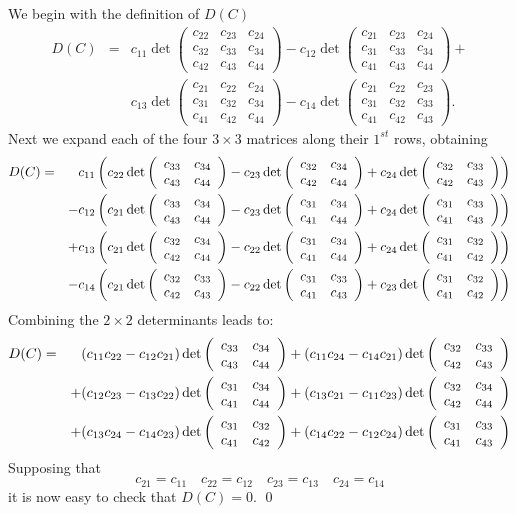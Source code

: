 We begin with the definition of $D(C)$
\begin{eqnarray*}
D(C) & = & c_{11}\det\left(\begin{array}{ccc} c_{22} & c_{23} & c_{24}
\\ c_{32} & c_{33} & c_{34} \\ c_{42} & c_{43} & c_{44}
\end{array}\right) 
-c_{12}\det\left(\begin{array}{ccc} c_{21} & c_{23} & c_{24}
\\ c_{31} & c_{33} & c_{34} \\ c_{41} & c_{43} & c_{44}
\end{array}\right) + \\ & &  
c_{13}\det\left(\begin{array}{ccc} c_{21} & c_{22} & c_{24}
\\ c_{31} & c_{32} & c_{34} \\ c_{41} & c_{42} & c_{44}
\end{array}\right) 
-c_{14}\det\left(\begin{array}{ccc} c_{21} & c_{22} & c_{23}
\\ c_{31} & c_{32} & c_{33} \\ c_{41} & c_{42} & c_{43}
\end{array}\right).
\end{eqnarray*}
Next we expand each of the four $3\times 3$ matrices along their
$1^{st}$ rows, obtaining
\begin{eqnarray*}
D(C) & = & 
c_{11}\left(c_{22}\det\left(\begin{array}{rr} c_{33} & c_{34}\\ c_{43} &c_{44}\end{array}\right)
-c_{23}\det\left(\begin{array}{rr} c_{32} & c_{34}\\ c_{42} &c_{44}\end{array}\right)
+c_{24}\det\left(\begin{array}{rr} c_{32} & c_{33}\\ c_{42} &c_{43}\end{array}\right)\right)\\ & &
-c_{12}\left(c_{21}\det\left(\begin{array}{rr} c_{33} & c_{34}\\ c_{43} &c_{44}\end{array}\right)
-c_{23}\det\left(\begin{array}{rr} c_{31} & c_{34}\\ c_{41} &c_{44}\end{array}\right)
+c_{24}\det\left(\begin{array}{rr} c_{31} & c_{33}\\ c_{41} &c_{43}\end{array}\right)\right)\\ & &
+c_{13}\left(c_{21}\det\left(\begin{array}{rr} c_{32} & c_{34}\\ c_{42} &c_{44}\end{array}\right)
-c_{22}\det\left(\begin{array}{rr} c_{31} & c_{34}\\ c_{41} &c_{44}\end{array}\right)
+c_{24}\det\left(\begin{array}{rr} c_{31} & c_{32}\\ c_{41} &c_{42}\end{array}\right)\right)\\ & &
-c_{14}\left(c_{21}\det\left(\begin{array}{rr} c_{32} & c_{33}\\ c_{42} &c_{43}\end{array}\right)
-c_{22}\det\left(\begin{array}{rr} c_{31} & c_{33}\\ c_{41} &c_{43}\end{array}\right)
+c_{23}\det\left(\begin{array}{rr} c_{31} & c_{32}\\ c_{41} &c_{42}\end{array}\right)\right)
\end{eqnarray*}
Combining the $2\times 2$ determinants leads to:
\begin{eqnarray*}
D(C) & = &
(c_{11}c_{22}-c_{12}c_{21})\det\left(\begin{array}{rr} c_{33} & c_{34}\\ c_{43} &c_{44}\end{array}\right)
+(c_{11}c_{24}-c_{14}c_{21})\det\left(\begin{array}{rr} c_{32} & c_{33}\\ c_{42} &c_{43}\end{array}\right)
\\ & & 
+(c_{12}c_{23}-c_{13}c_{22})\det\left(\begin{array}{rr} c_{31} & c_{34}\\ c_{41} &c_{44}\end{array}\right)
+(c_{13}c_{21}-c_{11}c_{23})\det\left(\begin{array}{rr} c_{32} & c_{34}\\ c_{42} &c_{44}\end{array}\right)
\\ & & 
+(c_{13}c_{24}-c_{14}c_{23})\det\left(\begin{array}{rr} c_{31} & c_{32}\\ c_{41} &c_{42}\end{array}\right)
+(c_{14}c_{22}-c_{12}c_{24})\det\left(\begin{array}{rr} c_{31} & c_{33}\\ c_{41} &c_{43}\end{array}\right)
\end{eqnarray*}
Supposing that 
\[
c_{21}=c_{11} \quad  c_{22}=c_{12} \quad c_{23}=c_{13} \quad
c_{24}=c_{14} 
\]
it is now easy to check that $D(C)=0$. \qed


